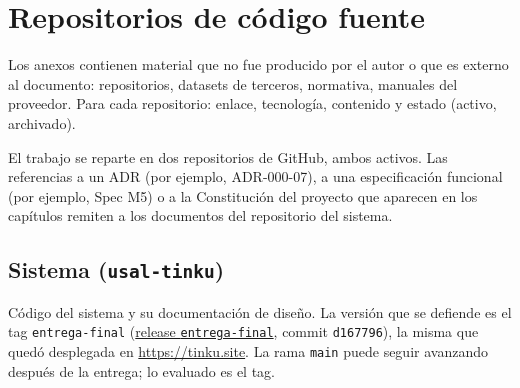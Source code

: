
\chapter{Repositorios de código fuente}\label{anx:repositorios}

\begin{guia}
Los anexos contienen material que no fue producido por el autor o que
es externo al documento: repositorios, datasets de terceros, normativa,
manuales del proveedor. Para cada repositorio: enlace, tecnología,
contenido y estado (activo, archivado).
\end{guia}

El trabajo se reparte en dos repositorios de GitHub, ambos activos. Las
referencias a un ADR (por ejemplo, ADR-000-07), a una especificación
funcional (por ejemplo, Spec M5) o a la Constitución del proyecto que
aparecen en los capítulos remiten a los documentos del repositorio del
sistema.

\section{Sistema \sistema{} (\texttt{usal-tinku})}


Código del sistema y su documentación de diseño. La versión que se
defiende es el tag \texttt{entrega-final}
(\href{https://github.com/smercadocarbone/usal-tinku/releases/tag/entrega-final}{release
\texttt{entrega-final}}, commit \texttt{d167796}), la misma que quedó
desplegada en \url{https://tinku.site}. La rama \texttt{main} puede
seguir avanzando después de la entrega; lo evaluado es el tag.

